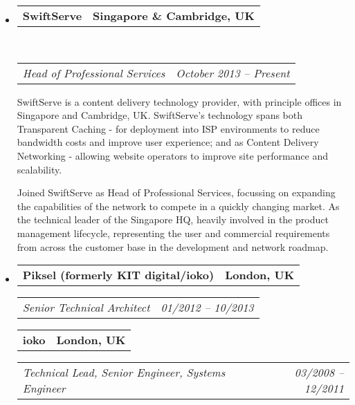 \documentclass[10pt,a4paper]{article}
\makeatletter
\newcommand{\headerrow}[2]
{\begin{tabular*}{\linewidth}{l@{\extracolsep{\fill}}r}
    #1 &
    #2 \\
\end{tabular*}}
\makeatother
\begin{document}
\begin{itemize}
    \parskip=0.1em

    \item
        \headerrow
            {\textbf{SwiftServe}}
            {\textbf{Singapore \& Cambridge, UK}}
        \\
        \headerrow
            {\emph{Head of Professional Services}}
            {\emph{October 2013 -- Present}}
    
            SwiftServe is a content delivery technology provider, with principle offices in Singapore and Cambridge, UK. SwiftServe's technology spans both Transparent Caching - for deployment into ISP environments to reduce bandwidth costs and improve user experience; and as Content Delivery Networking - allowing website operators to improve site performance and scalability.

            Joined SwiftServe as Head of Professional Services, focussing on expanding the capabilities of the network to compete in a quickly changing market. As the technical leader of the Singapore HQ, heavily involved in the product management lifecycle, representing the user and commercial requirements from across the customer base in the development and network roadmap.
            

    \item
    \headerrow
        {\textbf{Piksel (formerly KIT digital/ioko)}}
        {\textbf{London, UK}}
    \headerrow
        {\emph{Senior Technical Architect}}
        {\emph{01/2012 -- 10/2013}}
    \headerrow
        {\textbf{ioko}}
        {\textbf{London, UK}}   
    \headerrow
        {\emph{Technical Lead, Senior Engineer, Systems Engineer}}
        {\emph{03/2008 -- 12/2011}}


\end{itemize}
\end{document}
